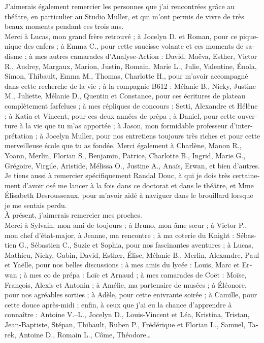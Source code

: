 \begin{otherlanguage}{french}

J'aimerais également remercier les personnes que j'ai rencontrées grâce au théâtre, en particulier au Studio Muller, et qui m'ont permis de vivre de très beaux moments pendant ces trois ans.\\

Merci à Lucas, mon grand frère retrouvé ; à Jocelyn D. et Roman, pour ce pique-nique des enfers ; à Emma C., pour cette saucisse volante et ces moments de sadisme ; à mes autres camarades d'Analyse-Action : David, Maëva, Esther, Victor R., Audrey, Margaux, Marion, Justin, Romain, Marie L., Julie, Valentine, Énola, Simon, Thibault, Emma M., Thomas, Charlotte H., pour m'avoir accompagné dans cette recherche de la vie ; à la compagnie B612 : Mélanie B., Nicky, Justine M., Juliette, Mélanie D., Quentin et Constance, pour ces écritures de plateau complètement farfelues ; à mes répliques de concours : Setti, Alexandre et Hélène ; à Katia et Vincent, pour ces deux années de prépa ; à Daniel, pour cette ouverture à la vie que tu m'as apportée ; à Jason, mon formidable professeur d'interprétation ; à Jocelyn Muller, pour nos entretiens toujours très riches et pour cette merveilleuse école que tu as fondée. Merci également à Charlène, Manon R., Yoann, Merlin, Florian S., Benjamin, Patrice, Charlotte B., Ingrid, Marie G., Grégoire, Virgile, Aristide, Mélissa O., Justine A., Anaïs, Erwan, et bien d'autres.\\

Je tiens aussi à remercier spécifiquement Randal Douc, à qui je dois très certainement d'avoir osé me lancer à la fois dans ce doctorat et dans le théâtre, et Mme Élisabeth Desrousseaux, pour m'avoir aidé à naviguer dans le brouillard lorsque je me sentais perdu.\\

À présent, j'aimerais remercier mes proches.\\

Merci à Sylvain, mon ami de toujours ; à Bruno, mon âme sœur ; à Victor P., mon chef d'état-major, à Jeanne, ma rencontre ; à ma coterie du Knight : Sébastien G., Sébastien C., Suzie et Sophia, pour nos fascinantes aventures ; à Lucas, Mathieu, Nicky, Gabin, David, Esther, Élise, Mélanie B., Merlin, Alexandre, Paul et Yaëlle, pour nos belles discussions ; à mes amis du lycée : Louis, Marc et Erwan ; à mes co de prépa : Loïc et Arnaud ; à mes camarades de Coët : Moïse, François, Alexis et Antonin ; à Amélie, ma partenaire de musées ; à Éléonore, pour nos agréables sorties ; à Adèle, pour cette enivrante soirée ; à Camille, pour cette douce après-midi ; enfin, à ceux que j'ai eu la chance d'apprendre à connaître : Antoine V.--L., Jocelyn D., Louis-Vincent et Léa, Kristina, Tristan, Jean-Baptiste, Stépan, Thibault, Ruben P., Frédérique et Florian L., Samuel, Tarek, Antoine D., Romain L., Côme, Théodore\ldots\\


\end{otherlanguage}
